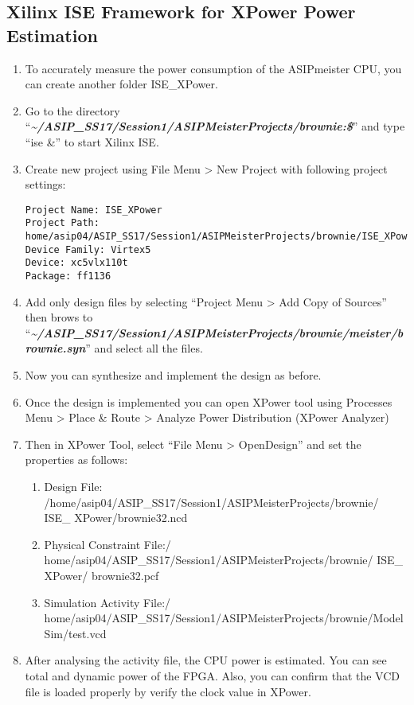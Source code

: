 \subsection{Xilinx ISE Framework for XPower Power Estimation}
\begin{enumerate}[resume]
\item To accurately measure the power consumption of the ASIPmeister CPU, you can create another folder ISE\_XPower.
\item Go to the directory ``\emph{\small{\textbf{\textasciitilde/ASIP\_SS17/Session1/ASIPMeisterProjects/brownie:\$}}}'' and type ``ise \&'' to start Xilinx ISE.
\item Create new project using File Menu \textgreater{} New Project with following project settings:
\begin{lstlisting}
Project Name: ISE_XPower
Project Path:
home/asip04/ASIP_SS17/Session1/ASIPMeisterProjects/brownie/ISE_XPower
Device Family: Virtex5
Device: xc5vlx110t
Package: ff1136
\end{lstlisting}
\item Add only design files by selecting ``Project Menu \textgreater{} Add Copy of Sources'' then brows to ``\emph{\small{\textbf{\textasciitilde/ASIP\_SS17/Session1/ASIPMeisterProjects/brownie/meister/brownie.syn}}}'' and select all the files.
\item Now you can synthesize and implement the design as before.
\item Once the design is implemented you can open XPower tool using Processes Menu \textgreater{} Place \& Route \textgreater{} Analyze Power Distribution (XPower Analyzer)
\item Then in XPower Tool, select ``File Menu \textgreater{} OpenDesign'' and set the properties as follows:
	\begin{enumerate}
		\def\labelenumii{\alph{enumii}.}
		\item
		Design File:
		/home/asip04/ASIP\_SS17/Session1/ASIPMeisterProjects/brownie/ ISE\_
		XPower/brownie32.ncd
		\item
		Physical Constraint File:/
		home/asip04/ASIP\_SS17/Session1/ASIPMeisterProjects/brownie/ ISE\_
		XPower/ brownie32.pcf
		\item
		Simulation Activity File:/
		home/asip04/ASIP\_SS17/Session1/ASIPMeisterProjects/brownie/ModelSim/test.vcd
	\end{enumerate}
\item After analysing the activity file, the CPU power is estimated. You can see total and dynamic power of the FPGA. Also, you can confirm that the VCD file is loaded properly by verify the clock value in XPower.
\end{enumerate}

